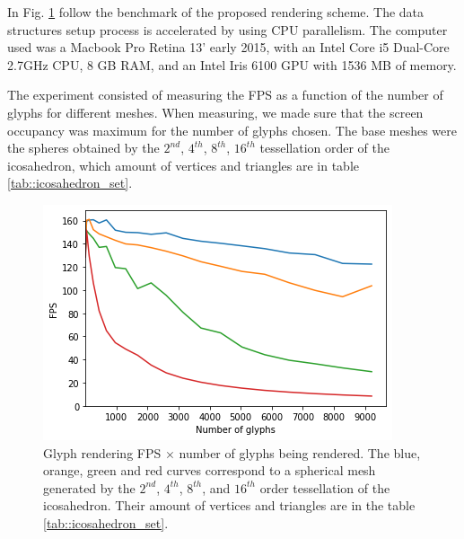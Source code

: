 \documentclass[twoside,twocolumn,10pt]{article}
\begin{document}
In Fig. \ref{fig::benchmark} follow the benchmark of the proposed rendering scheme. The data structures setup process is accelerated by using CPU parallelism. The computer used was a Macbook Pro Retina 13' early 2015, with an Intel Core i5 Dual-Core 2.7GHz CPU, 8 GB RAM, and an Intel Iris 6100 GPU with 1536 MB of memory.

The experiment consisted of measuring the FPS as a function of the number of glyphs for different meshes. When measuring, we made sure that the screen occupancy was maximum for the number of glyphs chosen. The base meshes were the spheres obtained by the $2^{nd}$, $4^{th}$, $8^{th}$, $16^{th}$ tessellation order of the icosahedron, which amount of vertices and triangles are in table \ref{tab::icosahedron_set}.




\begin{figure}[ht]
    \centering
    \includegraphics[width=1.00\linewidth, angle=0]{figs/Benchmark/benchmark_half.png}
    \caption{Glyph rendering FPS $\times$ number of glyphs being rendered. The blue, orange, green and red curves correspond to a spherical mesh  generated by the $2^{nd}$, $4^{th}$, $8^{th}$, and $16^{th}$ order tessellation of the icosahedron. Their amount of vertices and triangles are in the table \ref{tab::icosahedron_set}.
    }
    \label{fig::benchmark}
\end{figure}
\end{document}
